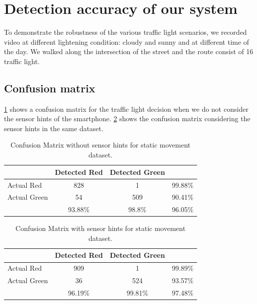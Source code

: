 \section{Detection accuracy of our system}
\label{s:acc}
To demonstrate the robustness of the various traffic light scenarios, we recorded video at different lightening condition: cloudy and sunny and at different time of the day.
We walked along the intersection of the street and the route consist of 16 traffic light.

\subsection{Confusion matrix}

\ref{t:con_nocrp} shows a confusion matrix for the traffic light decision when we do not consider the sensor hints of the smartphone.
\ref{t:con_crp} shows the confusion matrix considering the sensor hints in the same dataset.

\begin{table}[h!]
  \centering
  \caption{Confusion Matrix without sensor hints for static movement dataset.}
  \label{t:con_nocrp}
  \begin{tabular}{  l | c | c | r }
   
     & Detected Red & Detected Green &  \\
    \hline
    Actual Red & 828 & 1 & 99.88\% \\
    \hline
    Actual Green & 54 & 509 & 90.41\% \\
    \hline
    & 93.88\% & 98.8\% & 96.05\% \\
    
  \end{tabular}
\end{table}

\begin{table}[h!]
  \centering
  \caption{Confusion Matrix with sensor hints for static movement dataset.}
  \label{t:con_crp}
  \begin{tabular}{  l | c | c | r }
   
     & Detected Red & Detected Green &  \\
    \hline
    Actual Red & 909 & 1 & 99.89\% \\
    \hline
    Actual Green & 36 & 524 & 93.57\% \\
    \hline
    & 96.19\% & 99.81\% & 97.48\% \\
    
  \end{tabular}
\end{table}

